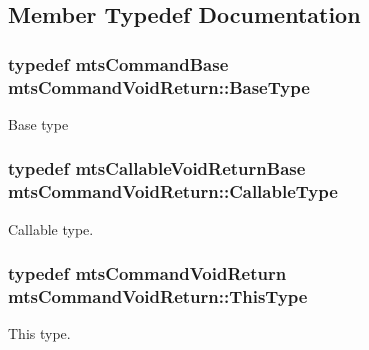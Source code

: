 \subsection{Member Typedef Documentation}
\hypertarget{classmts_command_void_return_a41ef4fa87ecb46aec2235730bdcc1088}{
\subsubsection[{Base\-Type}]{\setlength{\rightskip}{0pt plus 5cm}typedef {\bf mts\-Command\-Base} {\bf mts\-Command\-Void\-Return\-::\-Base\-Type}}}\label{classmts_command_void_return_a41ef4fa87ecb46aec2235730bdcc1088}
Base type \hypertarget{classmts_command_void_return_a101cc8bc0761aa0ab210c4f6d59ad81c}{
\subsubsection[{Callable\-Type}]{\setlength{\rightskip}{0pt plus 5cm}typedef {\bf mts\-Callable\-Void\-Return\-Base} {\bf mts\-Command\-Void\-Return\-::\-Callable\-Type}}}\label{classmts_command_void_return_a101cc8bc0761aa0ab210c4f6d59ad81c}
Callable type. \hypertarget{classmts_command_void_return_ae77b9e228137e3c73a41fbd1f38ee7fd}{
\subsubsection[{This\-Type}]{\setlength{\rightskip}{0pt plus 5cm}typedef {\bf mts\-Command\-Void\-Return} {\bf mts\-Command\-Void\-Return\-::\-This\-Type}}}\label{classmts_command_void_return_ae77b9e228137e3c73a41fbd1f38ee7fd}
This type. 

